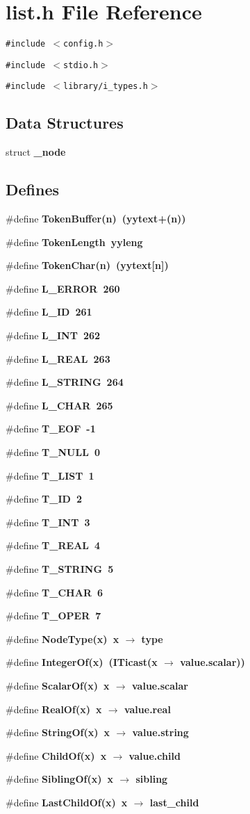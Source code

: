 \section{list.h File Reference}
\label{list_8h}
{\tt \#include $<$config.h$>$}\par
{\tt \#include $<$stdio.h$>$}\par
{\tt \#include $<$library/i\_\-types.h$>$}\par
\subsection*{Data Structures}
\begin{CompactItemize}
\item 
struct \bf{\_\-node}
\end{CompactItemize}
\subsection*{Defines}
\begin{CompactItemize}
\item 
\#define \bf{Token\-Buffer}(n)~(\bf{yytext}+(n))
\item 
\#define \bf{Token\-Length}~\bf{yyleng}
\item 
\#define \bf{Token\-Char}(n)~(\bf{yytext}[n])
\item 
\#define \bf{L\_\-ERROR}~260
\item 
\#define \bf{L\_\-ID}~261
\item 
\#define \bf{L\_\-INT}~262
\item 
\#define \bf{L\_\-REAL}~263
\item 
\#define \bf{L\_\-STRING}~264
\item 
\#define \bf{L\_\-CHAR}~265
\item 
\#define \bf{T\_\-EOF}~-1
\item 
\#define \bf{T\_\-NULL}~0
\item 
\#define \bf{T\_\-LIST}~1
\item 
\#define \bf{T\_\-ID}~2
\item 
\#define \bf{T\_\-INT}~3
\item 
\#define \bf{T\_\-REAL}~4
\item 
\#define \bf{T\_\-STRING}~5
\item 
\#define \bf{T\_\-CHAR}~6
\item 
\#define \bf{T\_\-OPER}~7
\item 
\#define \bf{Node\-Type}(x)~x $\rightarrow$ type
\item 
\#define \bf{Integer\-Of}(x)~(ITicast(x $\rightarrow$ value.scalar))
\item 
\#define \bf{Scalar\-Of}(x)~x $\rightarrow$ value.scalar
\item 
\#define \bf{Real\-Of}(x)~x $\rightarrow$ value.real
\item 
\#define \bf{String\-Of}(x)~x $\rightarrow$ value.string
\item 
\#define \bf{Child\-Of}(x)~x $\rightarrow$ value.child
\item 
\#define \bf{Sibling\-Of}(x)~x $\rightarrow$ sibling
\item 
\#define \bf{Last\-Child\-Of}(x)~x $\rightarrow$ last\_\-child
\end{CompactItemize}
